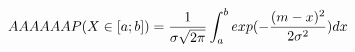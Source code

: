 \documentclass[preview]{standalone}
\begin{document}
\begin{align*}
AAAAAA P( X \in [a;b] ) = { \frac{1}{\sigma \sqrt{2\pi}} } \int_a^b { exp(-{  {(m - x)^2} \over {2 \sigma^2} }) } \space dx
\end{align*}
\end{document}
